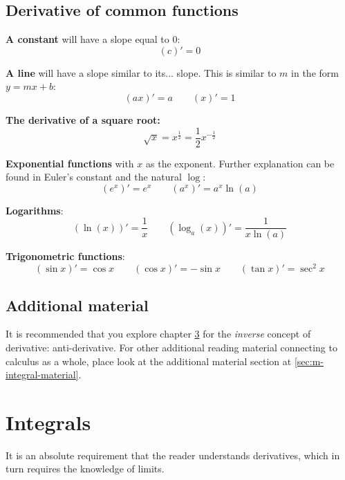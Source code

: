 \section{Derivative of common functions}
\textbf{A constant} will have a slope equal to $0$:
\begin{equation} (c)' = 0 \end{equation}

\textbf{A line} will have a slope similar to its... slope. This is similar to $m$ in the form $y=mx+b$:
\begin{equation}
    (ax)' = a
    \qquad
    (x)' = 1
\end{equation}

\textbf{The derivative of a square root:}
\begin{equation}
    \sqrt{x}
    = x^\frac{1}{2}
    = \frac{1}{2} x^{-\frac{1}{2}}
\end{equation}

\textbf{Exponential functions} with $x$ as the exponent. Further explanation can be found in Euler's constant and the natural $\log$:
\begin{equation}
    (e^x)' = e^x
    \qquad
    (a^x)' = a^x\ln(a)
\end{equation}

\textbf{Logarithms}:
\begin{equation}
    (\ln(x))' = \frac{1}{x}
    \qquad
    (\log_a(x) )' = \frac{1}{x\ln(a)}
\end{equation}

\textbf{Trigonometric functions}:
\begin{equation} 
    (\sin x)' = \cos x 
    \qquad
    (\cos x)' = -\sin x
    \qquad
    (\tan x)' = \sec^2x
\end{equation}

\section{Additional material}
It is recommended that you explore chapter \ref{sec:m-integral} for the \textit{inverse} concept of derivative: anti-derivative. For other additional reading material connecting to calculus as a whole, place look at the additional material section at \ref{sec:m-integral-material}.

\chapter{Integrals}\label{sec:m-integral}
It is an absolute requirement that the reader understands derivatives, which in turn requires the knowledge of limits. 

